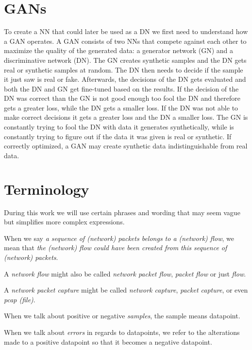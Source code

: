 \documentclass[
	ngerman,
	ruledheaders=section,%
	class=report,%
	thesis={type=bachelor},%
	accentcolor=9c,%
	custommargins=true,%
	marginpar=false,%
	parskip=half-,%
	fontsize=11pt,%
]{tudapub}
\begin{document}
\section{GANs}
\label{sec:GAN}

To create a NN that could later be used as a DN we first need to understand how a GAN operates.
A GAN consists of two NNs that compete against each other to maximize the quality of the generated data:
a generator network (GN) and a discriminative network (DN).
The GN creates synthetic samples and the DN gets real or synthetic samples at random.
The DN then needs to decide if the sample it just saw is real or fake.
Afterwards, the decisions of the DN gets evaluated and both the DN and GN get fine-tuned based on the results.
If the decision of the DN was correct than the GN is not good enough too fool the DN and therefore gets a greater loss, while the DN gets a smaller loss.
If the DN was not able to make correct decisions it gets a greater loss and the DN a smaller loss.
The GN is constantly trying to fool the DN with data it generates synthetically,
while is constantly trying to figure out if the data it was given is real or synthetic.
If correctly optimized, a GAN may create synthetic data indistinguishable from real data.

\pagebreak

\section{Terminology}
\label{sec:terminology}

During this work we will use certain phrases and wording that may seem vague but simplifies more complex expressions.

When we say \textit{a sequence of (network) packets belongs to a (network) flow}, we mean that \textit{the (network) flow could have been created from this sequence of (network) packets}.

A \textit{network flow} might also be called \textit{network packet flow}, \textit{packet flow} or just \textit{flow}.

A \textit{network packet capture} might be called \textit{network capture}, \textit{packet capture}, or even \textit{pcap (file)}.


When we talk about positive or negative \textit{samples}, the sample means datapoint.

When we talk about \textit{errors} in regards to datapoints, we refer to the alterations made to a positive datapoint so that it becomes a negative datapoint.
\end{document}
